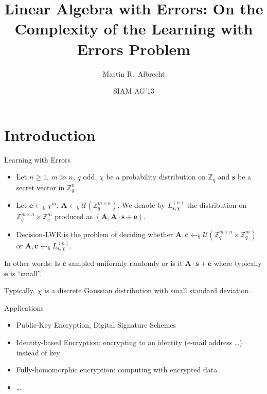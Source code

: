 \documentclass[10pt]{beamer}
\title{Linear Algebra with Errors: On the Complexity of the Learning with Errors Problem}
\author[Martin R.\ Albrecht]{Martin R.\ Albrecht}
\institute[Universities of Somewhere and Elsewhere] %
{joint work with C.\ Cid, J-C.\ Faugère, R.\ Fitzpatrick, and L.\ Perret}
\date{SIAM AG'13}
\newcommand{\U}[1]{\ensuremath{\mathcal{U}(#1)\xspace}}
\renewcommand{\vec}[1]{\mathbf{#1}\xspace}
\newcommand{\Z}{\ensuremath{\mathbb{Z}}\xspace}
\newcommand{\Ldis}{L_{\mathbf{s},\chi}^{(n)}\xspace}
\newcommand{\sample}{\ensuremath{\leftarrow_{\$}}}
\begin{document}
\begin{frame}[plain] %
  \titlepage
\end{frame}



\section{Introduction}

\begin{frame}{Learning with Errors}
\begin{definition}
\begin{itemize}
\item Let $n\geq 1$, $m \gg n$, $q$ odd, $\chi$ be a probability distribution on $\Z_q$ and $\vec{s}$ be a secret vector in $\Z_q^n$.
\pause
\item Let $\vec{e} \sample \chi^m$, $\vec{A} \sample \U{\Z_q^{m \times n}}$. We denote by $\Ldis$ the distribution on $\Z_q^{m \times n} \times \Z_q^m$ produced as $(\vec{A}, \vec{A} \cdot \vec{s} + \vec{e})$.
\pause
\item Decision-LWE is the problem of deciding whether $\vec{A},\vec{c} \sample \U{\Z_q^{m\times n} \times \Z_q^{m}}$ or $\vec{A},\vec{c} \sample \Ldis$.
\end{itemize}
\end{definition}

\pause

In other words: Is $\vec{c}$ sampled uniformly randomly or is it $\vec{A} \cdot \vec{s} + \vec{e}$ where typically $\vec{e}$ is ``small''.

\vspace{1em}

Typically, $\chi$ is a discrete Gaussian distribution with small standard deviation.

\end{frame}

\begin{frame}{Applications}

\begin{itemize}
\item Public-Key Encryption, Digital Signature Schemes
\item Identity-based Encryption: encrypting to an identity (e-mail address \dots) instead of key
\item Fully-homomorphic encryption: computing with encrypted data
\item \dots
\end{itemize}
\end{frame}
\end{document}
